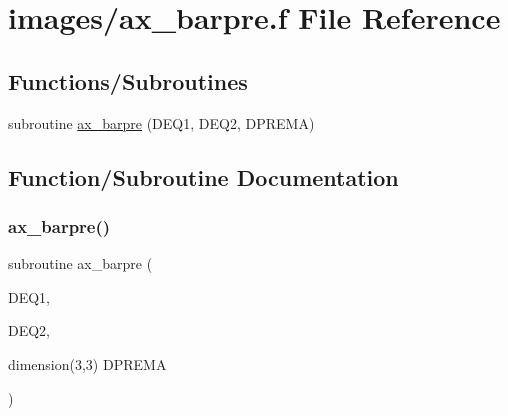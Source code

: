 \hypertarget{ax__barpre_8f}{}\section{images/ax\+\_\+barpre.f File Reference}
\label{ax__barpre_8f}
\subsection*{Functions/\+Subroutines}
\begin{DoxyCompactItemize}
\item 
subroutine \hyperlink{ax__barpre_8f_a9020b23c5668065e05f85c1dbe4d4237}{ax\+\_\+barpre} (D\+E\+Q1, D\+E\+Q2, D\+P\+R\+E\+MA)
\end{DoxyCompactItemize}


\subsection{Function/\+Subroutine Documentation}
\mbox{\label{ax__barpre_8f_a9020b23c5668065e05f85c1dbe4d4237}} 
\subsubsection{\texorpdfstring{ax\+\_\+barpre()}{ax\_barpre()}}
{\footnotesize\ttfamily subroutine ax\+\_\+barpre (\begin{DoxyParamCaption}\item[{}]{D\+E\+Q1,  }\item[{}]{D\+E\+Q2,  }\item[{dimension(3,3)}]{D\+P\+R\+E\+MA }\end{DoxyParamCaption})}

